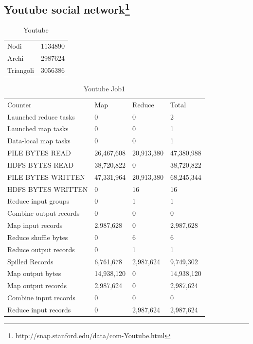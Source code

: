 \documentclass[paper=a4, fontsize=11pt]{scrartcl}	%
\numberwithin{equation}{section}															%
\numberwithin{figure}{section}																%
\numberwithin{table}{section}																%
\begin{document}
\subsection{Youtube social network\protect\footnote{http://snap.stanford.edu/data/com-Youtube.html}} 

\begin{table}[]
	\centering
	\caption{Youtube}
	\label{my-label}
	\begin{tabular}{ll}
		Nodi		 & 1134890\\
		Archi		 & 2987624 \\
		Triangoli	& 3056386 \\		
	\end{tabular}
\end{table}
\begin{table}[]
	\centering
	\caption{Youtube Job1}
	\label{my-label}
	\begin{tabular}{llll}
		Counter	&Map	&Reduce	&Total\\
		Launched reduce tasks	&0	&0	&2\\
		Launched map tasks	&0	&0	&1\\
		Data-local map tasks	&0	&0	&1\\
		FILE BYTES READ	&26,467,608	&20,913,380	&47,380,988\\
		HDFS BYTES READ	&38,720,822	&0	&38,720,822\\
		FILE BYTES WRITTEN	&47,331,964	&20,913,380	&68,245,344\\
		HDFS BYTES WRITTEN	&0	&16	&16\\
		Reduce input groups	&0	&1	&1\\
		Combine output records	&0	&0	&0\\
		Map input records	&2,987,628	&0	&2,987,628\\
		Reduce shuffle bytes	&0	&6	&6\\
		Reduce output records	&0	&1	&1\\
		Spilled Records	&6,761,678	&2,987,624	&9,749,302\\
		Map output bytes	&14,938,120	&0	&14,938,120\\
		Map output records	&2,987,624	&0	&2,987,624\\
		Combine input records	&0	&0	&0\\
		Reduce input records	&0	&2,987,624	&2,987,624\\
	\end{tabular}
\end{table}
\end{document}
